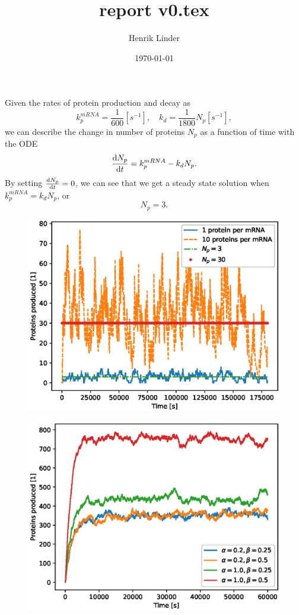 \documentclass{article}
\title{report v0.tex }
\author{Henrik Linder}
\date{\today}
\begin{document}
\maketitle

Given the rates of protein production and decay as 
\begin{equation}
	k_p^{mRNA} = \frac{1}{600}[s^{-1}],\quad k_d = \frac{1}{1800}N_p[s^{-1}],
\end{equation}
we can describe the change in number of proteins $N_p$ as a function of time with the ODE 
\begin{equation}
	\label{eq:protein_ODE}
	\dv {N_p}{t} = k_p^{mRNA}  - k_dN_p .
\end{equation}
By setting $\dv {N_p}{t} = 0 $, we can see that we get a steady state solution when $k_p^{mRNA} = k_dN_p$, or 
\begin{equation}
	\label{eq:steady_state}
	N_p = 3.
\end{equation}


\begin{figure}[H]
	\centering
\includegraphics[width = \linewidth]{figs/task1_results_v3.eps}
	\label{fig:task1_results}
\end{figure}

\begin{figure}[H]
	\centering
	\includegraphics[width = \linewidth]{figs/task2_prot_prod_v4.eps}
	\label{fig:task1_results}
\end{figure}
\end{document}
